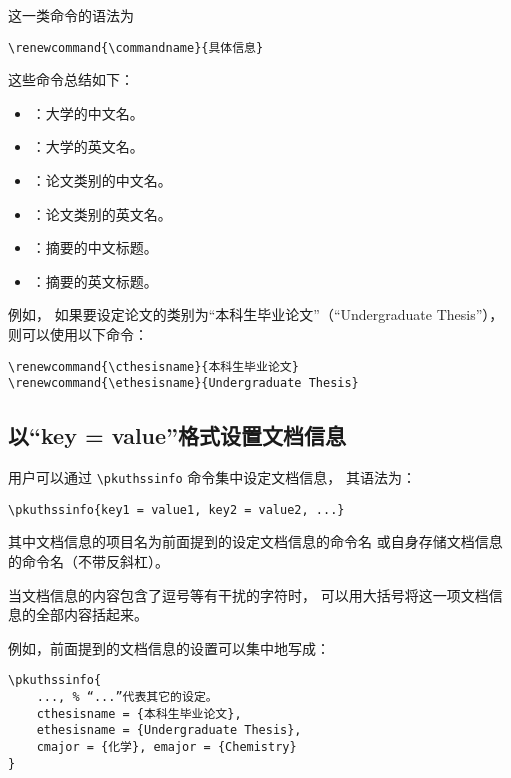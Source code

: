 这一类命令的语法为
\begin{Verbatim}[frame = single]
% commandname 为具体的命令名。
\renewcommand{\commandname}{具体信息}
\end{Verbatim}

这些命令总结如下：
\begin{itemize}
	\item \texttt{\bfseries\string\cuniversity}：大学的中文名。
	\item \texttt{\bfseries\string\euniversity}：大学的英文名。
	\item \texttt{\bfseries\string\cthesisname}：论文类别的中文名。
	\item \texttt{\bfseries\string\ethesisname}：论文类别的英文名。
	\item \texttt{\bfseries\string\cabstractname}：摘要的中文标题。
	\item \texttt{\bfseries\string\eabstractname}：摘要的英文标题。
\end{itemize}

例如，
如果要设定论文的类别为“本科生毕业论文”（“Undergraduate Thesis”），
则可以使用以下命令：
\begin{Verbatim}[frame = single]
\renewcommand{\cthesisname}{本科生毕业论文}
\renewcommand{\ethesisname}{Undergraduate Thesis}
\end{Verbatim}

\subsection{以“key = value”格式设置文档信息}

用户可以通过 \verb|\pkuthssinfo| 命令集中设定文档信息，
其语法为：
\begin{Verbatim}[frame = single]
% key1、key2、value1、value2 等为具体文档信息的项目名和内容。
\pkuthssinfo{key1 = value1, key2 = value2, ...}
\end{Verbatim}
其中文档信息的项目名为前面提到的设定文档信息的命令名
或自身存储文档信息的命令名（不带反斜杠）。

当文档信息的内容包含了逗号等有干扰的字符时，
可以用大括号将这一项文档信息的全部内容括起来。

例如，前面提到的文档信息的设置可以集中地写成：
\begin{Verbatim}[frame = single, tabsize = 4]
\pkuthssinfo{
	..., % “...”代表其它的设定。
	cthesisname = {本科生毕业论文},
	ethesisname = {Undergraduate Thesis},
	cmajor = {化学}, emajor = {Chemistry}
}
\end{Verbatim}

